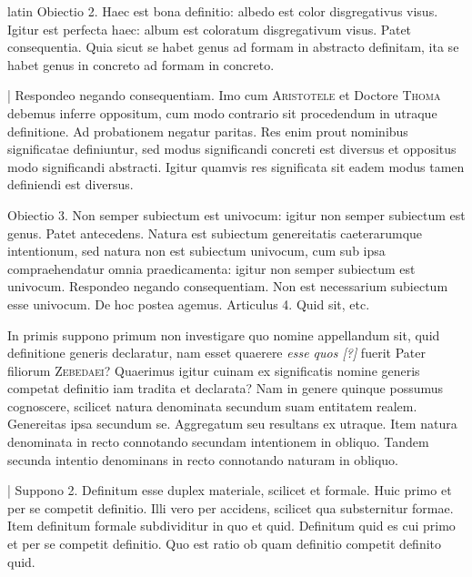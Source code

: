 \begin{otherlanguage*}{latin}
\pstart
Obiectio 2. Haec est bona definitio:
albedo est color disgregativus visus. Igitur est perfecta haec:
album est coloratum disgregativum visus. Patet consequentia. Quia sicut se habet genus ad formam in abstracto definitam, ita se habet genus in concreto ad formam in concreto. 
\pend

\pstart
\textnormal{|} Respondeo negando consequentiam. Imo cum \textsc{Aristotele} et Doctore \textsc{Thoma} debemus inferre oppositum, cum modo contrario sit procedendum in utraque definitione. Ad probationem negatur paritas. Res enim prout nominibus significatae definiuntur, sed modus significandi concreti est diversus et oppositus modo significandi abstracti. Igitur quamvis res significata sit eadem modus tamen definiendi est diversus. 
\pend

\pstart
Obiectio 3. Non semper subiectum est univocum:
igitur non semper subiectum est genus. Patet antecedens. Natura est subiectum genereitatis caeterarumque intentionum, sed natura non est subiectum univocum, cum sub ipsa compraehendatur omnia praedicamenta:
igitur non semper subiectum est univocum. Respondeo negando consequentiam. Non est necessarium subiectum esse univocum. De hoc postea agemus. Articulus 4. Quid sit, etc. 
\pend

\pstart
{}
\pend

\pstart
In primis suppono primum non investigare quo nomine appellandum sit, quid definitione generis declaratur, nam esset quaerere \emph{esse quos [?]} fuerit Pater filiorum \textsc{Zebedaei}? Quaerimus igitur cuinam ex significatis nomine generis competat definitio iam tradita et declarata? Nam in genere quinque possumus cognoscere, scilicet natura denominata secundum suam entitatem realem. Genereitas ipsa secundum se. Aggregatum seu resultans ex utraque. Item natura denominata in recto connotando secundam intentionem in obliquo. Tandem secunda intentio denominans in recto connotando naturam in obliquo. 
\pend

\pstart
\textnormal{|} Suppono 2. Definitum esse duplex materiale, scilicet et formale. Huic primo et per se competit definitio. Illi vero per accidens, scilicet qua substernitur formae. Item definitum formale subdividitur in quo et quid. Definitum quid es cui primo et per se competit definitio. Quo est ratio ob quam definitio competit definito quid. 
\pend


\end{otherlanguage*}
